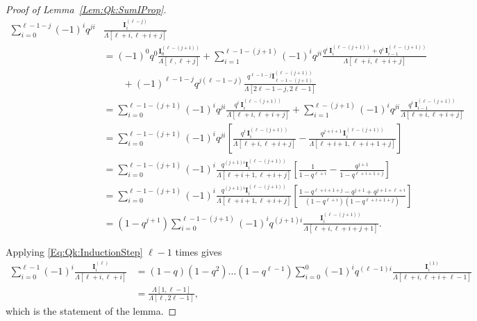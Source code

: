 \documentclass[letterpaper,11pt]{article}
\theoremstyle{definition}
\theoremstyle{remark}
\newcommand{\product}{\Lambda}
\newcommand{\sumI}{\mathbf{I}}
\begin{document}
\begin{proof}[Proof of Lemma~\ref{Lem:Qk:SumIProp}]
	\begin{align*}
		\sum_{i=0}^{\ell-1-j}(-1)^{i}q^{ji}&\frac{\sumI_{i}^{(\ell-j)}}{\product[\ell+i,\ell+i+j]}\\
		&=(-1)^{0}q^{0}\frac{\sumI_{0}^{(\ell-(j+1))}}{\product[\ell,\ell+j]}
		+\sum_{i=1}^{\ell-1-(j+1)}(-1)^{i}q^{ji}\frac{q^{i}\,\sumI_{i}^{(\ell-(j+1))} + q^{i}\,\sumI_{i-1}^{(\ell-(j+1))}}{\product[\ell+i,\ell+i+j]}\\
		&\qquad+(-1)^{\ell-1-j}q^{j(\ell-1-j)}\frac{q^{\ell-1-j}\sumI_{\ell-1-(j+1)}^{(\ell-(j+1))}}{\product[2\ell-1-j,2\ell-1]}
		\\
		&=\sum_{i=0}^{\ell-1-(j+1)}(-1)^{i}q^{ji} 
		\frac{q^{i}\,\sumI_{i}^{(\ell-(j+1))}}{\product[\ell+i,\ell+i+j]}   +\sum_{i=1}^{\ell-(j+1)}(-1)^{i}q^{ji}\frac{q^{i}\,\sumI_{i-1}^{(\ell-(j+1))}}{\product[\ell+i,\ell+i+j]}
		\\
		&=\sum_{i=0}^{\ell-1-(j+1)}(-1)^{i}q^{ji}\left[
		\frac{q^{i}\,\sumI_{i}^{(\ell-(j+1))}}{\product[\ell+i,\ell+i+j]}
		-
		\frac{q^{j+i+1}\,\sumI_{i}^{(\ell-(j+1))}}{\product[\ell+i+1,\ell+i+1+j]}
		\right]\\
		&=\sum_{i=0}^{\ell-1-(j+1)}
		(-1)^{i}
		\frac
		{q^{(j+1)i}\sumI_{i}^{(\ell-(j+1))}}
		{\product[\ell+i+1,\ell+i+j]}
		\left[
		\frac{1}{1-q^{\ell+i}}
		-
		\frac{q^{j+1}}{1-q^{\ell+i+1+j}}
		\right]
		\\
		&=\sum_{i=0}^{\ell-1-(j+1)}
		(-1)^{i}
		\frac
		{q^{(j+1)i}\sumI_{i}^{(\ell-(j+1))}}
		{\product[\ell+i+1,\ell+i+j]}
		\left[
		\frac{1-q^{\ell+i+1+j}-q^{j+1}+  q^{j+1+\ell+i}}{(1-q^{\ell+i})(1-q^{\ell+i+1+j})}
		\right]
		\\
		&=(1-q^{j+1})\sum_{i=0}^{\ell-1-(j+1)}(-1)^{i}q^{(j+1)i}\frac{\sumI_{i}^{(\ell-(j+1))}}{\product[\ell+i,\ell+i+j+1]}.
	\end{align*}
	
	
	
	
	Applying \eqref{Eq:Qk:InductionStep} $\ell-1$ times  gives
	\begin{align*}
		\sum_{i=0}^{\ell-1}(-1)^{i}\frac{\sumI_{i}^{(\ell)}}{\product[\ell+i,\ell+i]} &=
		(1-q)(1-q^2)\ldots(1-q^{\ell-1})\sum_{i=0}^{0}(-1)^{i}q^{(\ell-1)i}\frac{\sumI_{i}^{(1)}}{\product[\ell+i,\ell+i+\ell-1]}\\
		&= 		\frac{\product[1,\ell-1]}{\product[\ell,2\ell-1]}  ,
	\end{align*} 	
	which is the statement of the lemma.
\end{proof}
\end{document}
